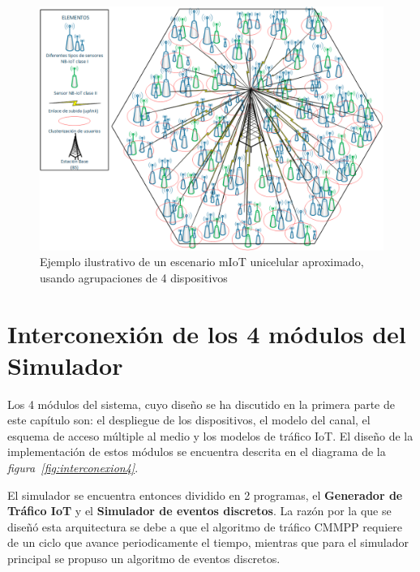 \begin{figure}[th]
\centering
\includegraphics[scale=.65]{Figures/Escenario mIoT unicelda}
\decoRule
\caption[Ejemplo ilustrativo de un escenario mIoT unicelular aproximado, usando agrupaciones de 4 dispositivos]{Ejemplo ilustrativo de un escenario mIoT unicelular aproximado, usando agrupaciones de 4 dispositivos}
\label{fig:EscenarioMTC}
\end{figure}
\section{Interconexión de los 4 módulos del Simulador}

Los 4 módulos del sistema, cuyo diseño se ha discutido en la primera parte de este capítulo son: el despliegue de los dispositivos, el modelo del canal, el esquema de acceso múltiple al medio y los modelos de tráfico IoT. El diseño de la implementación de estos módulos se encuentra descrita en el diagrama de la \textit{figura~\ref{fig:interconexion4}}. \newline

El simulador se encuentra entonces dividido en 2 programas, el \textbf{Generador de Tráfico IoT} y el \textbf{Simulador de eventos discretos}. La razón por la que se diseñó esta arquitectura se debe a que el algoritmo de tráfico CMMPP requiere de un ciclo que avance periodicamente el tiempo, mientras que para el simulador principal se propuso un algoritmo de eventos discretos.\newline

